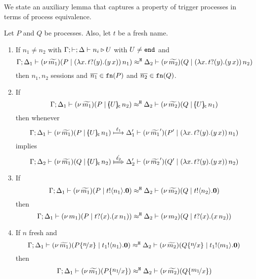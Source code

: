 
We state an auxiliary lemma that captures a property of trigger
processes in terms of process equivalence.
\begin{lemma}
	\label{lem:trigger_application}
	Let $P$ and $Q$ be processes. Also, let $t$ be a fresh name.
	\begin{enumerate}
		\item
			If $n_1 \not= n_2$ with $\Gamma; \vdash; \Delta \vdash n_i \triangleright U$ with $U \not= \mathtt{end}$
			and
			\[
				\Gamma; \Delta_1 \vdash (\nu\, \widetilde{m_1})(P \;|\; (\lambda x.\,t ? (y) . (y\, {x}))\, {n_1} ) \approx^\mathtt{H} \Delta_2 \vdash (\nu\, \widetilde{m_2})(Q \;|\; (\lambda x.\,t ? (y) . (y\, {x}))\, {n_2} )
			\]
			then $n_1, n_2$ sessions and $\overline{n_1} \in \mathtt{fn}(P)$ and $\overline{n_2} \in \mathtt{fn}(Q)$.

		\item
			If
			\[
				\horel{\Gamma}{\Delta_1}{\newsp{\widetilde{m_1}}{P \Par  \appl{\omapchar{U}}{n_2} }}%
				{\hwb}
				{\Delta_2}{\newsp{\widetilde{m_2}}{Q \Par \appl{\omapchar{U}}{n_1} }} %
			\]
			then whenever
			\[
				\horel{\Gamma}{\Delta_1}{\newsp{\widetilde{m_1}}{P \Par \appl{\omapchar{U}}{n_1} }} %
				{\hby{\ell_1}}
				{\Delta_1'}{\newsp{\widetilde{m_1}'}{P' \Par \appl{(\trvalx{t})}{n_1} }}
			\]
			implies
			\[
				\horel{\Gamma}{\Delta_2}{\newsp{\widetilde{m_1}}{Q \Par \appl{\omapchar{U}}{n_2} }} %
				{\Hby{\hat{\ell_2}}}
				{\Delta_2'}{\newsp{\widetilde{m_2}'}{Q' \Par \appl{(\trvalx{t})}{n_2} }} %
			\]
			
		\item
			If
			\[
				\Gamma; \Delta_1 \vdash  (\nu\, \widetilde{m_1})(P \;|\; t ! \langle n_1 \rangle . \mathbf{0})  \approx^\mathtt{H} \Delta_2 \vdash  (\nu\, \widetilde{m_2})(Q \;|\; t ! \langle n_2 \rangle . \mathbf{0})
			\]
			then
			\[
				\Gamma; \Delta_1 \vdash  (\nu\, m_1)(P \;|\; t ? (x) .{(x\, {n_1})})  \approx^\mathtt{H} \Delta_2 \vdash  (\nu\, m_2)(Q \;|\; t ? (x) .{(x\, {n_2})})
			\]

		\item
			If $n$ fresh and
			\[
				\horel{\Gamma}{\Delta_1}{ \newsp{\widetilde{m_1}}{P \subst{n}{x} \Par \bout{t_1}{n_1} \inact }}
				{\hwb}
				{\Delta_2}{ \newsp{\widetilde{m_2}}{Q \subst{n}{x} \Par \bout{t_1}{m_1} \inact }}
			\]
			then
			\[
				\horel{\Gamma}{\Delta_1}{ \newsp{\widetilde{m_1}}{P \subst{n_1}{x} }}
				{\hwb}
				{\Delta_2}{ \newsp{\widetilde{m_2}}{Q \subst{m_1}{x} }}
			\]


\end{enumerate}
\end{lemma}
